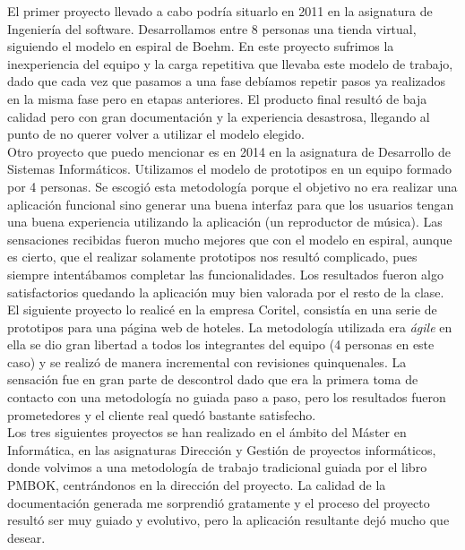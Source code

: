 El primer proyecto llevado a cabo podría situarlo en 2011 en la
asignatura de Ingeniería del software. Desarrollamos entre 8 personas
una tienda virtual, siguiendo el modelo en espiral de Boehm. En este
proyecto sufrimos la inexperiencia del equipo y la carga repetitiva
que llevaba este modelo de trabajo, dado que cada vez que pasamos a
una fase debíamos repetir pasos ya realizados en la misma fase pero en
etapas anteriores. El producto final resultó de baja calidad pero con
gran documentación y la experiencia desastrosa, llegando al punto de
no querer volver a utilizar el modelo elegido.\\

Otro proyecto que puedo mencionar es en 2014 en la asignatura de
Desarrollo de Sistemas Informáticos. Utilizamos el modelo de
prototipos en un equipo formado por 4 personas. Se escogió esta
metodología porque el objetivo no era realizar una aplicación
funcional sino generar una buena interfaz para que los usuarios tengan
una buena experiencia utilizando la aplicación (un reproductor de
música). Las sensaciones recibidas fueron mucho mejores que con el
modelo en espiral, aunque es cierto, que el realizar solamente
prototipos nos resultó complicado, pues siempre intentábamos completar
las funcionalidades. Los resultados fueron algo satisfactorios
quedando la aplicación muy bien valorada por el resto de la clase.\\

El siguiente proyecto lo realicé en la empresa Coritel, consistía en
una serie de prototipos para una página web de hoteles. La metodología
utilizada era \emph{ágile} en ella se dio gran libertad a todos los
integrantes del equipo (4 personas en este caso) y se realizó de
manera incremental con revisiones quinquenales. La sensación fue en
gran parte de descontrol dado que era la primera toma de contacto con
una metodología no guiada paso a paso, pero los resultados fueron
prometedores y el cliente real quedó bastante satisfecho.\\

Los tres siguientes proyectos se han realizado en el ámbito del Máster
en Informática, en las asignaturas Dirección y Gestión de proyectos
informáticos, donde volvimos a una metodología de trabajo tradicional
guiada por el libro PMBOK, centrándonos en la dirección del
proyecto. La calidad de la documentación generada me sorprendió
gratamente y el proceso del proyecto resultó ser muy guiado y
evolutivo, pero la aplicación resultante dejó mucho que desear.\\

